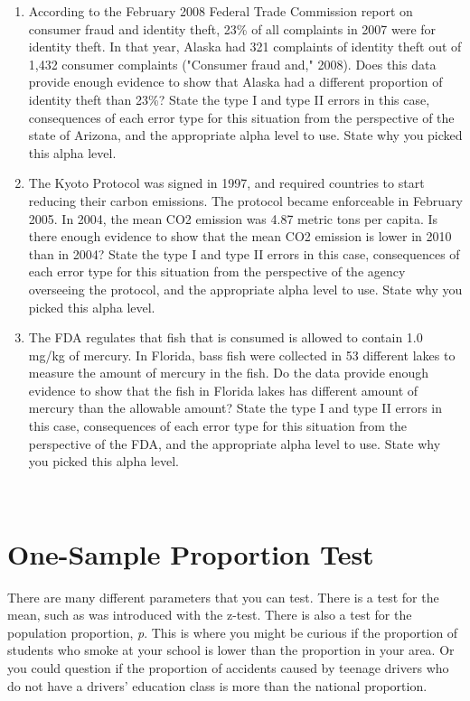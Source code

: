 \documentclass[]{book}
\begin{document}
\begin{enumerate}
\item
  According to the February 2008 Federal Trade Commission report on consumer fraud and identity theft, 23\% of all complaints in 2007 were for identity theft. In that year, Alaska had 321 complaints of identity theft out of 1,432 consumer complaints ("Consumer fraud and," 2008). Does this data provide enough evidence to show that Alaska had a different proportion of identity theft than 23\%? State the type I and type II errors in this case, consequences of each error type for this situation from the perspective of the state of Arizona, and the appropriate alpha level to use. State why you picked this alpha level.
\item
  The Kyoto Protocol was signed in 1997, and required countries to start reducing their carbon emissions. The protocol became enforceable in February 2005. In 2004, the mean CO2 emission was 4.87 metric tons per capita. Is there enough evidence to show that the mean CO2 emission is lower in 2010 than in 2004? State the type I and type II errors in this case, consequences of each error type for this situation from the perspective of the agency overseeing the protocol, and the appropriate alpha level to use. State why you picked this alpha level.
\item
  The FDA regulates that fish that is consumed is allowed to contain 1.0 mg/kg of mercury. In Florida, bass fish were collected in 53 different lakes to measure the amount of mercury in the fish. Do the data provide enough evidence to show that the fish in Florida lakes has different amount of mercury than the allowable amount? State the type I and type II errors in this case, consequences of each error type for this situation from the perspective of the FDA, and the appropriate alpha level to use. State why you picked this alpha level.
\end{enumerate}

\textbf{\\
}

\hypertarget{one-sample-proportion-test}{%
\section{One-Sample Proportion Test}\label{one-sample-proportion-test}}

There are many different parameters that you can test. There is a test for the mean, such as was introduced with the z-test. There is also a test for the population proportion, \emph{p}. This is where you might be curious if the proportion of students who smoke at your school is lower than the proportion in your area. Or you could question if the proportion of accidents caused by teenage drivers who do not have a drivers' education class is more than the national proportion.
\end{document}
